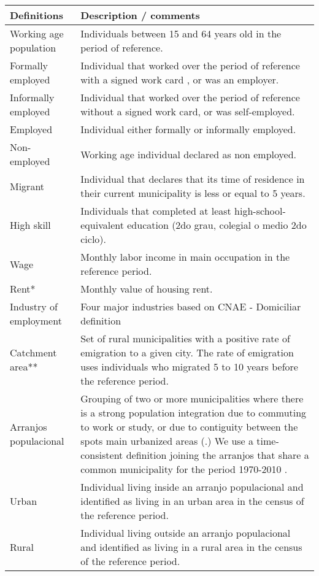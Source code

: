 \renewcommand{\arraystretch}{1.3}
    \begin{tabular}{lp{47.5em}}
    \textbf{Definitions} & \multicolumn{1}{l}{\textbf{Description / comments}} \\
    \midrule
    Working age population & Individuals between 15 and 64 years old in the period of reference. \\
    Formally employed & Individual that worked over the period of reference with a signed work card , or was an employer. \\
    Informally employed & Individual that worked over the period of reference without a signed work card, or was self-employed.  \\
    Employed & Individual either formally or informally employed. \\
    Non-employed & Working age individual declared as non employed. \\
    Migrant & Individual that declares that its time of residence in their current municipality is less or equal to 5 years.  \\
    High skill & Individuals that completed at least high-school-equivalent education (2do grau, colegial o medio 2do ciclo). \\
    Wage  & Monthly labor income in main occupation in the reference period. \\
    Rent* & Monthly value of housing rent. \\
    Industry of employment & Four major industries based on CNAE - Domiciliar definition \\
    Catchment area** & Set of rural municipalities with a positive rate of emigration to a given city. The rate of  emigration uses individuals who migrated 5 to 10 years before the reference period. \\
    Arranjos populacional & Grouping of two or more municipalities where there is a strong population integration due to commuting to work or study, or due to contiguity between the spots main urbanized areas (\citealp{IBGE2016}.) We use a time-consistent definition joining the arranjos that share a common municipality for the period 1970-2010 . \\
    Urban  & Individual living inside an arranjo populacional and identified as living in an urban area in the census of the reference period. \\
    Rural & Individual living outside an arranjo populacional and identified as living in a rural area in the census of the reference period. \\
    \bottomrule
    \end{tabular}%
